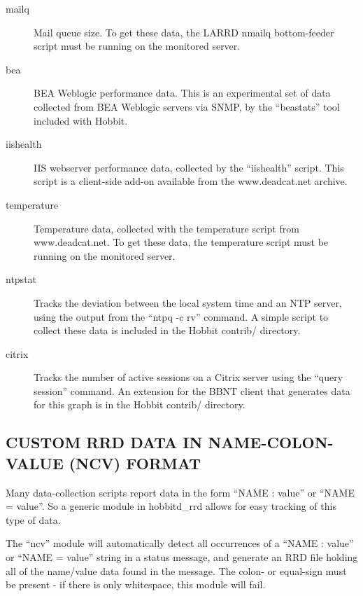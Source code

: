 \begin{description}
 

\item[mailq] Mail queue size. To get these data, the LARRD nmailq bottom-feeder script must be running on the monitored server. 

 

\item[bea] BEA Weblogic performance data. This is an experimental set of data collected from BEA Weblogic servers via SNMP, by the ``beastats'' tool included with Hobbit. 

 

\item[iishealth] IIS webserver performance data, collected by the ``iishealth'' script. This script is a client-side add-on available from the www.deadcat.net archive. 

 

\item[temperature] Temperature data, collected with the temperature script from www.deadcat.net. To get these data, the temperature script must be running on the monitored server. 

 

\item[ntpstat] Tracks the deviation between the local system time and an NTP server, using the output from the ``ntpq -c rv'' command. A simple script to collect these data is included in the Hobbit contrib/ directory. 

 

\item[citrix] Tracks the number of active sessions on a Citrix server using the ``query session'' command. An extension for the BBNT client that generates data for this graph is in the Hobbit contrib/ directory. 

 


 


\end{description}

\subsection{CUSTOM RRD DATA IN NAME-COLON-VALUE (NCV) FORMAT}
 Many data-collection scripts report data in the form ``NAME : value'' or ``NAME = value''. So a generic module in hobbitd\_rrd allows for easy tracking of this type of data. 

  The ``ncv'' module will automatically detect all occurrences of a ``NAME : value'' or ``NAME = value'' string in a status message, and generate an RRD file holding all of the name/value data found in the message. The colon- or equal-sign must be present - if there is only whitespace, this module will fail. 


